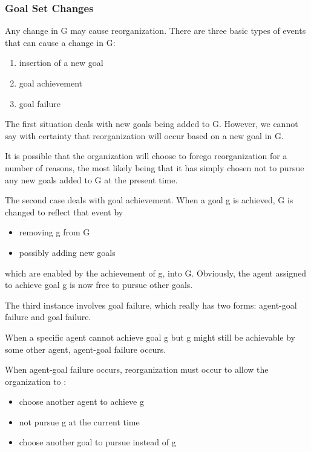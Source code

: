 \subsubsection{Goal Set Changes}
Any change in G may cause reorganization. There are three basic types 
of events that can cause a change in G: 
\begin{enumerate}
\item insertion of a new goal 
\item goal achievement 
\item goal failure
\end{enumerate}

The first situation deals with new goals being added to G. However, \cite{omacs2}
we cannot say with certainty that reorganization will occur based on a new goal in G. 

It is possible that the organization will choose to forego reorganization for a number of reasons, the most likely being that it has simply chosen not to pursue any new goals added to G at the present time.

The second case deals with goal achievement. When a goal g is achieved, G is changed to reflect that event by 

\begin{itemize}
\newcommand{\localtextbulletone}{\textcolor{gray}{\raisebox{.45ex}{\rule{.6ex}{.6ex}}}}
\renewcommand{\labelitemi}{\localtextbulletone}
\item removing g from G
\item possibly adding new goals
\end{itemize}	

 which are enabled by the achievement of g, into G. Obviously, the agent assigned to achieve goal g is now free to pursue other goals. 

The third instance involves goal failure, which really has two forms: agent-goal failure and goal failure.

When a specific agent cannot achieve goal g but g might still be achievable by some other agent, 
agent-goal failure occurs. 

When agent-goal failure occurs, reorganization must occur to allow the organization to :

\begin{itemize}
\newcommand{\localtextbulletone}{\textcolor{gray}{\raisebox{.45ex}{\rule{.6ex}{.6ex}}}}
\renewcommand{\labelitemi}{\localtextbulletone}
\item choose another agent to achieve g
\item not pursue g at the current time
\item choose another goal to pursue instead of g
\end{itemize}	
 
